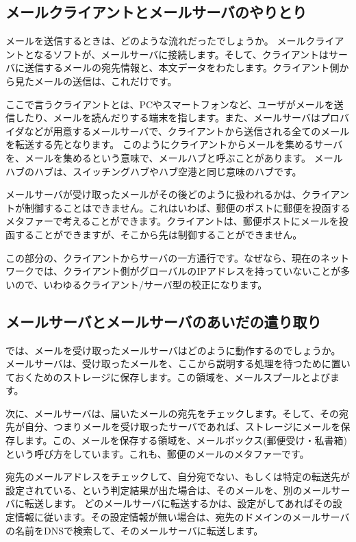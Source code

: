 \subsection{メールクライアントとメールサーバのやりとり}

メールを送信するときは、どのような流れだったでしょうか。
メールクライアントとなるソフトが、メールサーバに接続します。そして、クライアントはサーバに送信するメールの宛先情報と、本文データをわたします。クライアント側から見たメールの送信は、これだけです。

ここで言うクライアントとは、PCやスマートフォンなど、ユーザがメールを送信したり、メールを読んだりする端末を指します。また、メールサーバはプロバイダなどが用意するメールサーバで、クライアントから送信される全てのメールを転送する先となります。
このようにクライアントからメールを集めるサーバを、メールを集めるという意味で、メールハブと呼ぶことがあります。
メールハブのハブは、スイッチングハブやハブ空港と同じ意味のハブです。


メールサーバが受け取ったメールがその後どのように扱われるかは、クライアントが制御することはできません。これはいわば、郵便のポストに郵便を投函するメタファーで考えることができます。クライアントは、郵便ポストにメールを投函することができますが、そこから先は制御することができません。

この部分の、クライアントからサーバの一方通行です。なぜなら、現在のネットワークでは、クライアント側がグローバルのIPアドレスを持っていないことが多いので、いわゆるクライアント/サーバ型の校正になります。


\subsection{メールサーバとメールサーバのあいだの遣り取り}

では、メールを受け取ったメールサーバはどのように動作するのでしょうか。
メールサーバは、受け取ったメールを、ここから説明する処理を待つために置いておくためのストレージに保存します。この領域を、メールスプールとよびます。

次に、メールサーバは、届いたメールの宛先をチェックします。そして、その宛先が自分、つまりメールを受け取ったサーバであれば、ストレージにメールを保存します。この、メールを保存する領域を、メールボックス(郵便受け・私書箱)という呼び方をしています。これも、郵便のメールのメタファーです。

宛先のメールアドレスをチェックして、自分宛でない、もしくは特定の転送先が設定されている、という判定結果が出た場合は、そのメールを、別のメールサーバに転送します。
どのメールサーバに転送するかは、設定がしてあればその設定情報に従います。その設定情報が無い場合は、宛先のドメインのメールサーバの名前をDNSで検索して、そのメールサーバに転送します。

